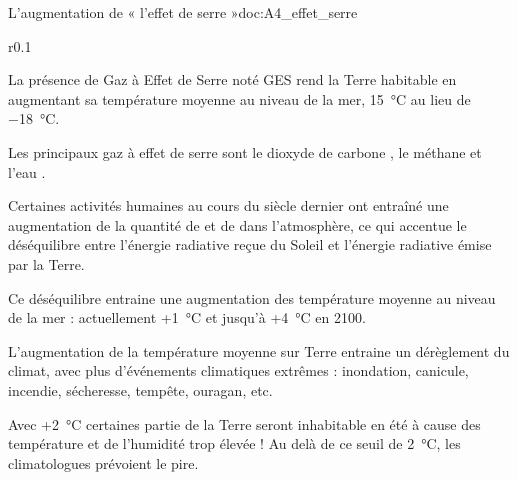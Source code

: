 \begin{doc}{L'augmentation de « l'effet de serre »}{doc:A4_effet_serre}
  \begin{wrapfigure}[3]{r}{0.1\linewidth}
    \vspace*{-18pt}
  \end{wrapfigure}
  La présence de Gaz à Effet de Serre noté GES rend la Terre habitable en augmentant sa température moyenne au niveau de la mer, \qty{15}{\degreeCelsius} au lieu de \qty{-18}{\degreeCelsius}.

  \begin{encart}  
    Les principaux gaz à effet de serre sont le dioxyde de carbone ,
    le méthane  et l'eau .
  \end{encart}

  Certaines activités humaines au cours du siècle dernier ont entraîné une augmentation de la quantité de  et de  dans l'atmosphère, ce qui accentue le déséquilibre entre l'énergie radiative reçue du Soleil et l'énergie radiative émise par la Terre.

  Ce déséquilibre entraine une augmentation des température moyenne au niveau de la mer : actuellement +\qty{1}{\degreeCelsius} et jusqu'à +\qty{4}{\degreeCelsius} en 2100.

  \begin{encart}
    L'augmentation de la température moyenne sur Terre entraine un dérèglement du climat, avec plus d'événements climatiques extrêmes : inondation, canicule, incendie, sécheresse, tempête, ouragan, etc.
  \end{encart}

  Avec +\qty{2}{\degreeCelsius} certaines partie de la Terre seront inhabitable en été à cause des température et de l'humidité trop élevée ! 
  Au delà de ce seuil de \qty{2}{\degreeCelsius}, les climatologues prévoient le pire.
\end{doc}


